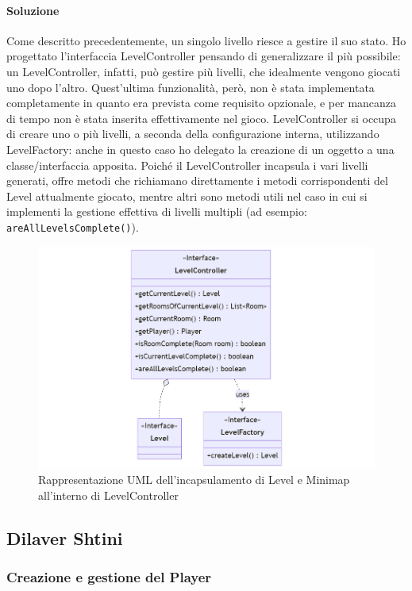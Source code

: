 \documentclass[a4paper,12pt]{report}
\begin{document}
\paragraph{Soluzione} Come descritto precedentemente, un singolo livello riesce a gestire il suo stato. 
Ho progettato l'interfaccia LevelController pensando di generalizzare il più possibile: un LevelController, 
infatti, può gestire più livelli, che idealmente vengono giocati uno dopo l'altro.
Quest'ultima funzionalità, però, non è stata implementata completamente in quanto era
prevista come requisito opzionale, e per mancanza di tempo non è stata inserita effettivamente nel gioco.
LevelController si occupa di creare uno o più livelli, a seconda della configurazione interna, utilizzando LevelFactory: 
anche in questo caso ho delegato la creazione di un oggetto a una classe/interfaccia apposita.
Poiché il LevelController incapsula i vari livelli generati, offre metodi che richiamano direttamente i metodi corrispondenti
del Level attualmente giocato, mentre altri sono metodi utili nel caso in cui si implementi la gestione effettiva di livelli
multipli (ad esempio: \texttt{areAllLevelsComplete()}).
\begin{figure}[H]
    \centering{}
    \includegraphics[scale=0.5]{diagram/levelController.png}
    \caption{Rappresentazione UML dell'incapsulamento di Level e Minimap all'interno di LevelController}
    \label{img:levelController}
\end{figure}


\subsection*{Dilaver Shtini}
\subsubsection{Creazione e gestione del Player}
\end{document}

